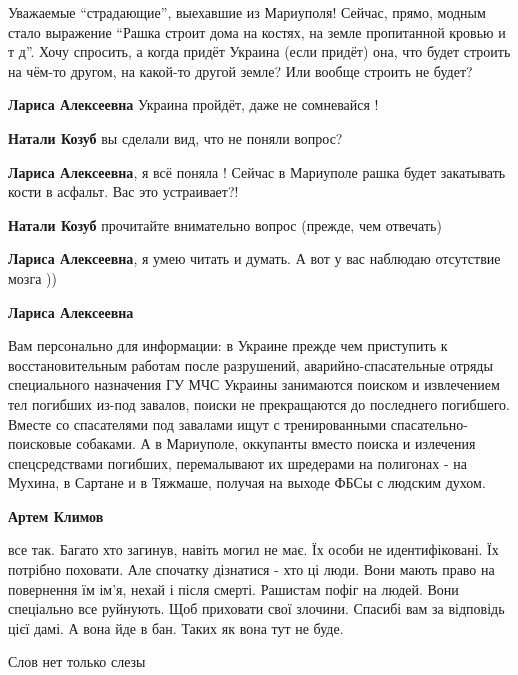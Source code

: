 
Уважаемые \enquote{страдающие}, выехавшие из Мариуполя! Сейчас, прямо, модным стало
выражение \enquote{Рашка строит дома на костях, на земле пропитанной кровью и т д}.
Хочу спросить, а когда придёт Украина (если придёт) она, что будет строить на
чём-то другом, на какой-то другой земле? Или вообще строить не будет?

\begin{itemize} %
\textbf{Лариса Алексеевна} Украина пройдёт, даже не сомневайся !

\textbf{Натали Козуб} вы сделали вид, что не поняли вопрос?

\textbf{Лариса Алексеевна}, я всё поняла ! Сейчас в Мариуполе рашка будет закатывать кости в асфальт. Вас это устраивает?!

\textbf{Натали Козуб} прочитайте внимательно вопрос (прежде, чем отвечать)

\textbf{Лариса Алексеевна}, я умею читать и думать. А вот у вас наблюдаю отсутствие мозга ))

\textbf{Лариса Алексеевна} 

Вам персонально для информации: в Украине прежде чем приступить к
восстановительным работам после разрушений, аварийно-спасательные отряды
специального назначения ГУ МЧС Украины занимаются поиском и извлечением тел
погибших из-под завалов, поиски не прекращаются до последнего погибшего. Вместе
со спасателями под завалами ищут с тренированными спасательно-поисковые
собаками. А в Мариуполе, оккупанты вместо поиска и излечения спецсредствами
погибших, перемалывают их шредерами на полигонах - на Мухина, в Сартане и в
Тяжмаше, получая на выходе ФБСы с людским духом.

\textbf{Артем Климов} 

все так. Багато хто загинув, навіть могил не має. Їх особи не идентифіковані.
Їх потрібно поховати. Але спочатку дізнатися - хто ці люди. Вони мають право на
повернення їм ім'я, нехай і після смерті. Рашистам пофіг на людей. Вони
спеціально все руйнують. Щоб приховати свої злочини. Спасибі вам за відповідь
цієї дамі. А вона йде в бан. Таких як вона тут не буде.

\end{itemize} %


Слов нет только слезы

